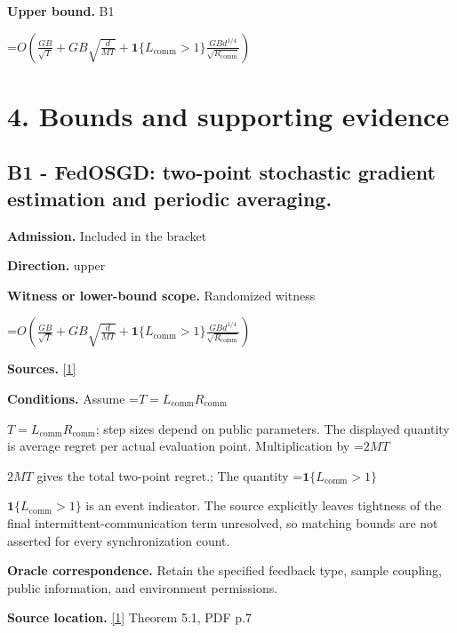 \documentclass[10pt,a4paper]{article}
\newcommand{\AtlasMath}[1]{\par\begingroup\centering\setbox0=\hbox{$\displaystyle #1$}\ifdim\wd0>1.4\linewidth\typeout{ATLAS WIDE FORMULA: \the\wd0}\fi\ifdim\wd0>\linewidth\resizebox{\linewidth}{!}{\box0}\else\box0\fi\par\endgroup}
\newcommand{\AtlasInlineMath}[1]{\begingroup\setbox0=\hbox{$#1$}\ifdim\wd0>.4\linewidth\endgroup\AtlasMath{#1}\else\endgroup$#1$\fi}
\begin{document}
\textbf{Upper bound.} B1



\AtlasMath{O\!\left(\frac{GB}{\sqrt T}+GB\sqrt{\frac d{MT}}+\mathbf1\{L_{\mathrm{comm}}>1\}\frac{GBd^{1/4}}{\sqrt{R_{\mathrm{comm}}}}\right)}


\section{4. Bounds and supporting evidence}


\subsection{B1 - FedOSGD: two-point stochastic gradient estimation and periodic averaging.}


\textbf{Admission.} Included in the bracket



\textbf{Direction.} upper



\textbf{Witness or lower-bound scope.} Randomized witness



\AtlasMath{O\!\left(\frac{GB}{\sqrt T}+GB\sqrt{\frac d{MT}}+\mathbf1\{L_{\mathrm{comm}}>1\}\frac{GBd^{1/4}}{\sqrt{R_{\mathrm{comm}}}}\right)}


\textbf{Sources.} \href{https://proceedings.mlr.press/v202/patel23a/patel23a.pdf}{[1]}



\textbf{Conditions.} Assume \AtlasInlineMath{T=L_{\mathrm{comm}}R_{\mathrm{comm}}}; step sizes depend on public parameters. The displayed quantity is average regret per actual evaluation point. Multiplication by \AtlasInlineMath{2MT} gives the total two-point regret.; The quantity \AtlasInlineMath{\mathbf1\{L_{\mathrm{comm}}>1\}} is an event indicator. The source explicitly leaves tightness of the final intermittent-communication term unresolved, so matching bounds are not asserted for every synchronization count.



\textbf{Oracle correspondence.} Retain the specified feedback type, sample coupling, public information, and environment permissions.



\textbf{Source location.} \href{https://proceedings.mlr.press/v202/patel23a/patel23a.pdf}{[1]} Theorem 5.1, PDF p.7
\end{document}
